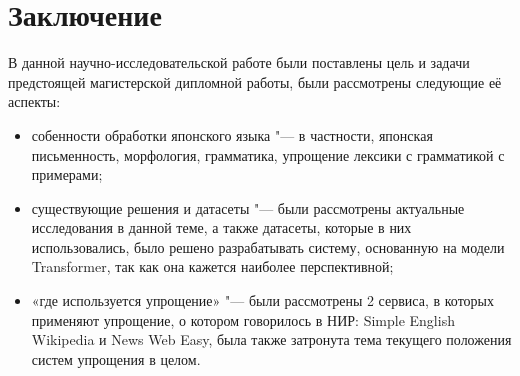 \chapter*{Заключение} \label{ch-conclusion}

В данной научно-исследовательской работе были поставлены цель и задачи предстоящей магистерской дипломной работы, были рассмотрены следующие её аспекты:
\begin{itemize}%
  \item собенности обработки японского языка "--- в частности, японская письменность, морфология, грамматика, упрощение лексики с грамматикой с примерами;
  \item существующие решения и датасеты "--- были рассмотрены актуальные исследования в данной теме, а также датасеты, которые в них использовались, было решено разрабатывать систему, основанную на модели Transformer, так как она кажется наиболее перспективной;
  \item «где используется упрощение» "--- были рассмотрены 2 сервиса, в которых применяют упрощение, о котором говорилось в НИР: Simple English Wikipedia и News Web Easy, была также затронута тема текущего положения систем упрощения в целом.
\end{itemize}